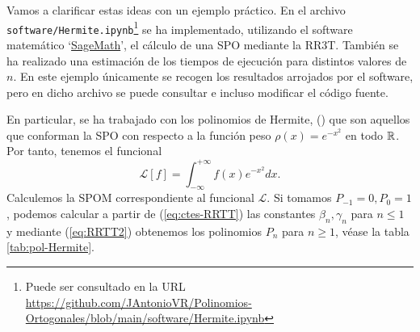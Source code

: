 \begin{ejemplo}
    Vamos a clarificar estas ideas con un ejemplo práctico. En el archivo \texttt{software/Hermite.ipynb}\footnote{Puede ser consultado en la URL \url{https://github.com/JAntonioVR/Polinomios-Ortogonales/blob/main/software/Hermite.ipynb}} se ha implementado, utilizando el software matemático `\href{https://www.sagemath.org/}{SageMath}', el cálculo de una SPO mediante la RR3T. También se ha realizado una estimación de los tiempos de ejecución para distintos valores de $n$. En este ejemplo únicamente se recogen los resultados arrojados por el software, pero en dicho archivo se puede consultar e incluso modificar el código fuente.
    
    En particular, se ha trabajado con los polinomios de Hermite, () que son aquellos que conforman la SPO con respecto a la función peso $\rho(x)=e^{-x^2}$ en todo $\mathbb{R}$. Por tanto, tenemos el funcional
    $$
    \mathcal{L}[f] = \int_{-\infty}^{+\infty} f(x) e^{-x^2}dx.
    $$
    Calculemos la SPOM correspondiente al funcional $\mathcal L$. Si tomamos $P_{-1}=0, P_0=1$, podemos calcular a partir de (\ref{eq:ctes-RRTT}) las constantes $\beta_n,\gamma_n$ para $n\leq 1$ y mediante (\ref{eq:RRTT2}) obtenemos los polinomios $P_n$ para $n\geq 1$, véase la tabla \ref{tab:pol-Hermite}.


\end{ejemplo}
